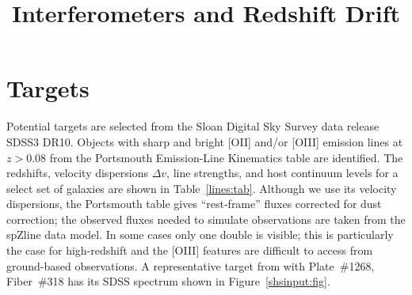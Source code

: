 \documentclass[preprint]{aastex}
\begin{document}
\title{Interferometers and Redshift Drift}
\section{Targets}
Potential targets are selected from the Sloan Digital Sky Survey data release SDSS3 DR10.  Objects with sharp and bright [OII] and/or [OIII] emission lines at $z>0.08$ from the  Portsmouth Emission-Line Kinematics table \citep{2013MNRAS.431.1383T}  are
identified.
The redshifts, velocity dispersions $\Delta v$, line strengths, and host continuum levels for a select set of galaxies are shown in Table~\ref{lines:tab}.
Although we use its velocity dispersions, the Portsmouth table  gives ``rest-frame'' fluxes corrected for dust correction;
the observed fluxes needed to simulate observations are taken from the spZline data model.  In some cases only one double is visible; this is particularly the 
case for high-redshift and the [OIII] features are difficult to access from ground-based observations.
A representative 
target from with Plate~\#1268, Fiber~\#318 has its  SDSS spectrum shown in Figure~\ref{shsinput:fig}.
\end{document}
